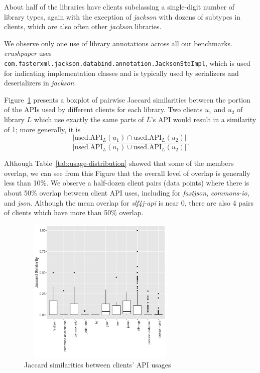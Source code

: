 About half of the libraries have clients subclassing a
single-digit number of library types, again with the exception of
\emph{jackson} with dozens of subtypes in clients, which are also often other \emph{jackson} libraries.

We observe only one use of library annotations across all our benchmarks. \emph{crushpaper} uses \texttt{com.fasterxml.jackson.databind.annotation.JacksonStdImpl}, which is used for indicating implementation classes and is typically used by serializers and deserializers in \emph{jackson}.

Figure~\ref{fig:jaccard} presents a boxplot of
pairwise Jaccard similarities between the portion of
the APIs used by different clients for each library. Two clients $u_1$ and $u_2$ 
of library $L$ which use exactly the same parts of $L$'s API would result in a similarity of 1;
more generally, it is
\[ \frac{|\mbox{used.API}_L(u_1) \cap \mbox{used.API}_L(u_2)|}{|\mbox{used.API}_L(u_1) \cup \mbox{used.API}_L(u_2)|}. \]

Although Table~\ref{tab:usage-distribution} showed that some of the members overlap, we can
see from this Figure that the overall level of overlap is generally less than 10\%. We observe
a half-dozen client pairs (data points) where there is about 50\% overlap between client API uses, including for \emph{fastjson},
\emph{commons-io}, and \emph{json}. Although the mean overlap for \emph{slf4j-api} is near 0, there are also 4 pairs of clients which have more than 50\% overlap.

\begin{center}
\begin{figure}
\centering
\includegraphics[width=8cm, height=7cm]{./images/jac-sim-box-plot-declared}
\caption{\label{fig:jaccard}Jaccard similarities between clients' API usages}
\end{figure}
\end{center}

